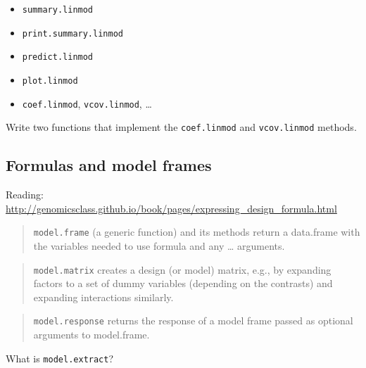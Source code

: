 \documentclass[]{book}
\theoremstyle{definition}
\theoremstyle{definition}
\theoremstyle{definition}
\theoremstyle{remark}
\let\BeginKnitrBlock\begin \let\EndKnitrBlock\end
\begin{document}
\begin{itemize}
\item
  \texttt{summary.linmod}
\item
  \texttt{print.summary.linmod}
\item
  \texttt{predict.linmod}
\item
  \texttt{plot.linmod}
\item
  \texttt{coef.linmod}, \texttt{vcov.linmod}, \ldots{}
\end{itemize}

\BeginKnitrBlock{exercise}
\protect\hypertarget{exr:unnamed-chunk-47}{}{\label{exr:unnamed-chunk-47}
}Write two functions that implement the \texttt{coef.linmod} and
\texttt{vcov.linmod} methods.
\EndKnitrBlock{exercise}

\subsection{Formulas and model frames}\label{formulas-and-model-frames}

Reading:
\url{http://genomicsclass.github.io/book/pages/expressing_design_formula.html}

\begin{quote}
\texttt{model.frame} (a generic function) and its methods return a
data.frame with the variables needed to use formula and any \ldots{}
arguments.
\end{quote}

\begin{quote}
\texttt{model.matrix} creates a design (or model) matrix, e.g., by
expanding factors to a set of dummy variables (depending on the
contrasts) and expanding interactions similarly.
\end{quote}

\begin{quote}
\texttt{model.response} returns the response of a model frame passed as
optional arguments to model.frame.
\end{quote}

\BeginKnitrBlock{exercise}
\protect\hypertarget{exr:unnamed-chunk-48}{}{\label{exr:unnamed-chunk-48}
}What is \texttt{model.extract}?
\EndKnitrBlock{exercise}
\end{document}
